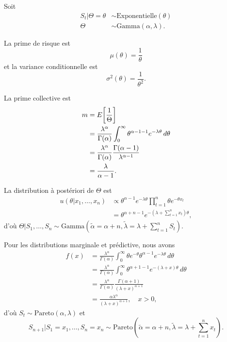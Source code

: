 \begin{exemple}
  \label{ex:bayesienne:poisson-exponentielle}
  Soit
  \begin{align*}
    S_t|\Theta = \theta &\sim \text{Exponentielle}(\theta) \\
                 \Theta &\sim \text{Gamma}(\alpha, \lambda).
  \end{align*}

  La prime de risque est
  \begin{equation*}
    \mu(\theta) = \frac{1}{\theta}
  \end{equation*}
  et la variance conditionnelle est
  \begin{equation*}
    \sigma^2(\theta) = \frac{1}{\theta^2}.
  \end{equation*}

  La prime collective est
  \begin{align*}
    m
    &= E\! \left[ \frac{1}{\Theta} \right] \\
    &= \frac{\lambda^\alpha}{\Gamma(\alpha)} \int_0^\infty
    \theta^{\alpha - 1 - 1} e^{-\lambda \theta}\, d\theta \\
    &= \frac{\lambda^\alpha}{\Gamma(\alpha)}
    \frac{\Gamma(\alpha - 1)}{\lambda^{\alpha - 1}} \\
    &= \frac{\lambda}{\alpha - 1}.
  \end{align*}

  La distribution à postériori de $\Theta$ est
  \begin{align*}
    u(\theta|x_1, \dots, x_n)
    &\propto \theta^{\alpha - 1} e^{-\lambda \theta}
    \prod_{t = 1}^n \theta e^{-\theta x_t} \\
    &= \theta^{\alpha + n - 1}
    e^{-(\lambda + \sum_{t = 1}^n x_t) \theta},
  \end{align*}
  d'où $\Theta|S_1, \dots, S_n \sim \text{Gamma}(\tilde{\alpha} =
  \alpha + n, \tilde{\lambda} = \lambda + \sum_{t = 1}^n S_t)$.

  Pour les distributions marginale et prédictive, nous avons
  \begin{align*}
    f(x)
    &= \frac{\lambda^\alpha}{\Gamma(\alpha)}  \int_0^\infty
    \theta e^{-\theta}
    \theta^{\alpha - 1} e^{-\lambda \theta}\, d\theta \\
    &= \frac{\lambda^\alpha}{\Gamma(\alpha)} \int_0^\infty
    \theta^{\alpha + 1 - 1} e^{-(\lambda + x) \theta}\, d\theta \\
    &= \frac{\lambda^\alpha}{\Gamma(\alpha)}
    \frac{\Gamma(\alpha + 1)}{(\lambda + x)^{\alpha + 1}} \\
    &= \frac{\alpha \lambda^\alpha}{(\lambda + x)^{\alpha + 1}}, \quad
    x > 0,
  \end{align*}
  d'où $S_t \sim \text{Pareto}(\alpha, \lambda)$ et
  \begin{equation*}
    \textstyle
    S_{n + 1}|S_1 = x_1, \dots, S_n = x_n \sim
    \text{Pareto}(\tilde{\alpha} = \alpha + n, \tilde{\lambda} = \lambda
    + \sum_{t = 1}^n x_t).
  \end{equation*}


\end{exemple}

